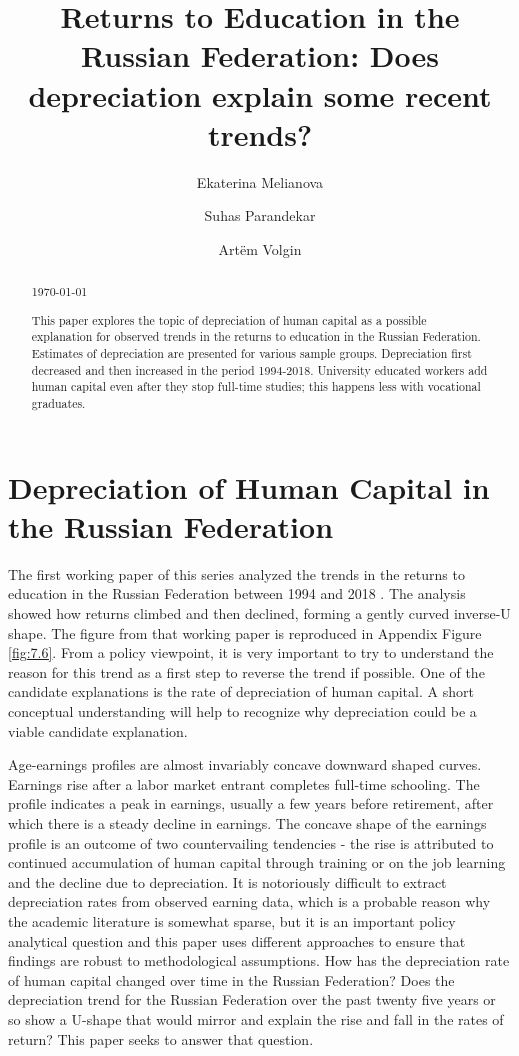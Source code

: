 \documentclass[alpha-refs]{wiley-article-02b}
\title{Returns to Education in the Russian Federation: Does depreciation explain some recent trends?}
\author[*]{Ekaterina Melianova}
\author[*]{\hspace{-1em}Suhas Parandekar}
\author[*]{\hspace{-1em}Art\"{e}m Volgin}
\affil[*]{Education Global Practice, Europe and Central Asia}
\begin{document}
	
\setcounter{page}{1} 

\maketitle

\begin{abstract}
	
\vspace{.5em} \today	
	
\noindent This paper explores the topic of depreciation of human capital as 
a 
possible explanation for observed trends in the returns to education in the 
Russian Federation. Estimates of depreciation are presented for various 
sample groups. Depreciation first decreased and then increased in the 
period 1994-2018. University educated workers add human capital even after 
they stop full-time studies; this happens less with vocational graduates. 
\end{abstract}


\section{Depreciation of Human Capital in the Russian Federation}

The first working paper of this series analyzed the trends in the returns 
to education in the Russian Federation between 1994 and 2018 
\parencite{Patrinos_2020}. The analysis showed how returns climbed and then 
declined, forming a gently curved inverse-U shape. The figure from that 
working paper is reproduced in Appendix Figure \ref{fig:7.6}. From a policy 
viewpoint, it is very important to try to understand the reason for this 
trend as a first step to reverse the trend if possible. One of the 
candidate explanations is the rate of depreciation of human capital. A 
short conceptual understanding will help to recognize why depreciation 
could be a viable candidate explanation. 

Age-earnings profiles are almost invariably concave downward shaped curves. 
Earnings rise after a labor market entrant completes full-time schooling. 
The profile indicates a peak in earnings, usually a few years before 
retirement, after which there is a steady decline in earnings. The concave 
shape of the earnings profile is an outcome of two countervailing 
tendencies - the rise is attributed to continued accumulation of human 
capital through training or on the job learning and the decline due to 
depreciation. It is notoriously difficult to extract depreciation rates 
from observed earning data, which is a probable reason why the academic 
literature is somewhat sparse, but it is an important policy analytical 
question and this paper uses different approaches to ensure that findings 
are robust to methodological assumptions. How has the depreciation rate of 
human capital changed over time in the Russian Federation? Does the 
depreciation trend for the Russian Federation over the past twenty five 
years or so show a U-shape that would mirror and explain the rise and fall 
in the rates of return? This paper seeks to answer that question. 
\end{document}
